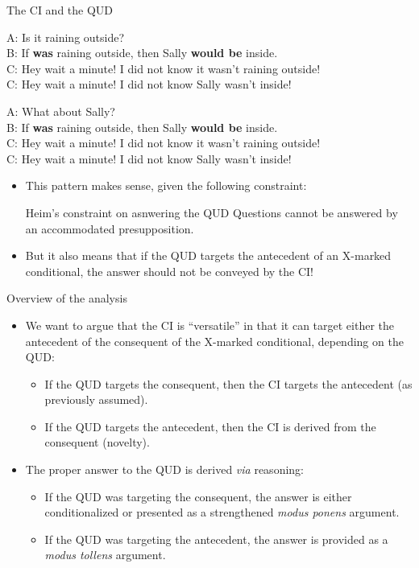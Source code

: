 \documentclass[10pt]{beamer}
\newcommand{\cmark}{\ding{51}}%
\newcommand{\xmark}{\ding{55}}%
\begin{document}
\begin{frame}{The CI and the QUD}
	\begin{exe}
		{A: Is it raining outside?\\
			B: If \textbf{was} raining outside, then Sally \textbf{would be} inside.\\
			C: Hey wait a minute! I did not know it wasn't raining outside! \hfill \xmark\\
			C: Hey wait a minute! I did not know Sally wasn't inside! \hfill \cmark}
	\end{exe}
	\begin{exe}
		\exr{ex:qud-cons}
		{A: What about Sally?\\
			B: If \textbf{was} raining outside, then Sally \textbf{would be} inside.\\
			C: Hey wait a minute! I did not know it wasn't raining outside! \hfill \cmark\\
			C: Hey wait a minute! I did not know Sally wasn't inside! \hfill \xmark}
	\end{exe}
	\begin{itemize}
		\item This pattern makes sense, given the following constraint:
		\begin{block}{Heim's constraint on asnwering the QUD}
			Questions cannot be answered by an accommodated presupposition. 
		\end{block}
		\item But it also means that if the QUD targets the antecedent of an X-marked conditional, the answer should not be conveyed by the CI!
	\end{itemize}

\end{frame}
\begin{frame}{Overview of the analysis}
	\begin{itemize}
		\item We want to argue that the CI is ``versatile'' in that it can target either the antecedent of the consequent of the X-marked conditional, depending on the QUD:
		\begin{itemize}
			\item If the QUD targets the consequent, then the CI targets the antecedent (as previously assumed).
			\item If the QUD targets the antecedent, then the CI is derived from the consequent (novelty).
		\end{itemize}
	\item The proper answer to the QUD is derived \textit{via} reasoning:
	\begin{itemize}
		\item If the QUD was targeting the consequent, the answer is either conditionalized or presented as a strengthened \textit{modus ponens} argument.
		\item If the QUD was targeting the antecedent, the answer is provided as a \textit{modus tollens} argument.
	\end{itemize}
	\end{itemize}
\end{frame}
\end{document}
